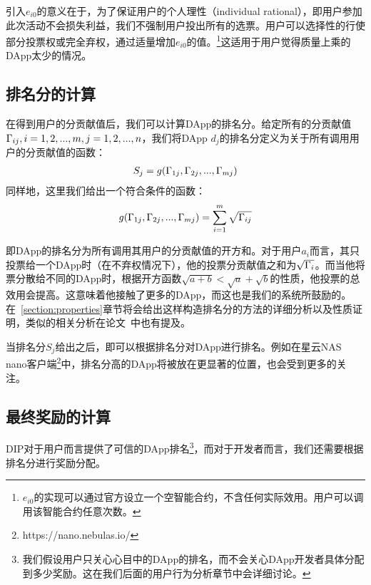 引入$e_{i0}$的意义在于，为了保证用户的个人理性（individual rational），即用户参加此次活动不会损失利益，我们不强制用户投出所有的选票。用户可以选择性的行使部分投票权或完全弃权，通过适量增加$e_{i0}$的值。\footnote{$e_{i0}$的实现可以通过官方设立一个空智能合约，不含任何实际效用。用户可以调用该智能合约任意次数。}这适用于用户觉得质量上乘的DApp太少的情况。


\subsection{排名分的计算}
在得到用户的分贡献值后，我们可以计算DApp的排名分。给定所有的分贡献值$\Gamma_{ij}, i=1,2,...,m,j=1,2,...,n$，我们将DApp $d_j$的排名分定义为关于所有调用用户的分贡献值的函数：
\begin{align}
S_j = g(\Gamma_{1j},\Gamma_{2j},...,\Gamma_{mj})
\end{align}
同样地，这里我们给出一个符合条件的函数：
\begin{align}
\label{eq:sqrt}
g(\Gamma_{1j},\Gamma_{2j},...,\Gamma_{mj}) = \sum_{i=1}^m \sqrt{\Gamma_{ij}}
\end{align}

即DApp的排名分为所有调用其用户的分贡献值的开方和。对于用户$a_i$而言，其只投票给一个DApp时（在不弃权情况下），他的投票分贡献值之和为$\sqrt{\Gamma_i}$。而当他将票分散给不同的DApp时，根据开方函数$\sqrt{a+b}<\sqrt{a}+\sqrt{b}$的性质，他投票的总效用会提高。这意味着他接触了更多的DApp，而这也是我们的系统所鼓励的。在~\ref{section:properties}章节将会给出这样构造排名分的方法的详细分析以及性质证明，类似的相关分析在论文~\cite{buterin2018liberal}中也有提及。


当排名分$S_j$给出之后，即可以根据排名分对DApp进行排名。例如在星云NAS nano客户端\footnote{https://nano.nebulas.io/}中，排名分高的DApp将被放在更显著的位置，也会受到更多的关注。


\subsection{最终奖励的计算}
DIP对于用户而言提供了可信的DApp排名\footnote{我们假设用户只关心心目中的DApp的排名，而不会关心DApp开发者具体分配到多少奖励。这在我们后面的用户行为分析章节中会详细讨论。}，而对于开发者而言，我们还需要根据排名分进行奖励分配。

